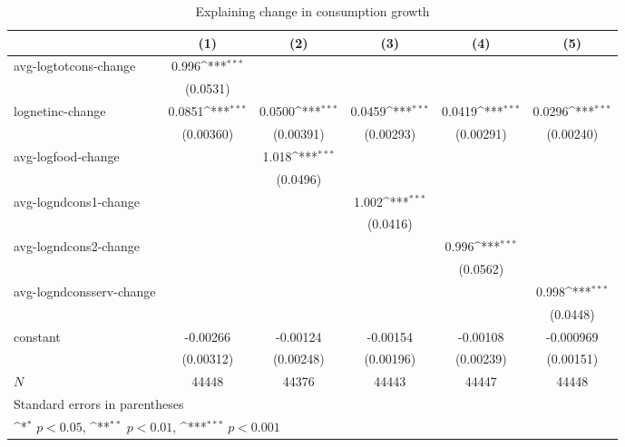 \begin{table}[!h]\centering
\def\sym#1{\ifmmode^{#1}\else\(^{#1}\)\fi}
\caption{\label{tab:2.2A-logdeltacons} Explaining change in consumption growth}
\begin{tabular}{l*{5}{c}}
\hline\hline
            &\multicolumn{1}{c}{(1)}         &\multicolumn{1}{c}{(2)}         &\multicolumn{1}{c}{(3)}         &\multicolumn{1}{c}{(4)}         &\multicolumn{1}{c}{(5)}         \\
\hline
avg-logtotcons-change&       0.996\sym{***}&                     &                     &                     &                     \\
            &    (0.0531)         &                     &                     &                     &                     \\
lognetinc-change&      0.0851\sym{***}&      0.0500\sym{***}&      0.0459\sym{***}&      0.0419\sym{***}&      0.0296\sym{***}\\
            &   (0.00360)         &   (0.00391)         &   (0.00293)         &   (0.00291)         &   (0.00240)         \\
avg-logfood-change&                     &       1.018\sym{***}&                     &                     &                     \\
            &                     &    (0.0496)         &                     &                     &                     \\
avg-logndcons1-change&                     &                     &       1.002\sym{***}&                     &                     \\
            &                     &                     &    (0.0416)         &                     &                     \\
avg-logndcons2-change&                     &                     &                     &       0.996\sym{***}&                     \\
            &                     &                     &                     &    (0.0562)         &                     \\
avg-logndconsserv-change&                     &                     &                     &                     &       0.998\sym{***}\\
            &                     &                     &                     &                     &    (0.0448)         \\
constant    &    -0.00266         &    -0.00124         &    -0.00154         &    -0.00108         &   -0.000969         \\
            &   (0.00312)         &   (0.00248)         &   (0.00196)         &   (0.00239)         &   (0.00151)         \\
\hline
\(N\)       &       44448         &       44376         &       44443         &       44447         &       44448         \\
\hline\hline
\multicolumn{6}{l}{\footnotesize Standard errors in parentheses}\\
\multicolumn{6}{l}{\footnotesize \sym{*} \(p<0.05\), \sym{**} \(p<0.01\), \sym{***} \(p<0.001\)}\\
\end{tabular}
\end{table}
